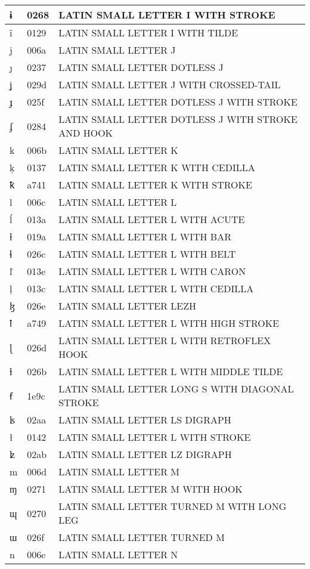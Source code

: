 \documentclass[12pt,letterpaper,openany]{book}
\begin{document}
\begin{center}
\begin{supertabular}{|m{0.25in}|m{0.5in}|m{4in}|}
ɨ & 0268 & LATIN SMALL LETTER I WITH STROKE\\\hline
ĩ & 0129 & LATIN SMALL LETTER I WITH TILDE\\\hline
j & 006a & LATIN SMALL LETTER J\\\hline
ȷ & 0237 & LATIN SMALL LETTER DOTLESS J\\\hline
ʝ & 029d & LATIN SMALL LETTER J WITH CROSSED-TAIL\\\hline
ɟ & 025f & LATIN SMALL LETTER DOTLESS J WITH STROKE\\\hline
ʄ & 0284 & LATIN SMALL LETTER DOTLESS J WITH STROKE AND HOOK\\\hline
k & 006b & LATIN SMALL LETTER K\\\hline
ķ & 0137 & LATIN SMALL LETTER K WITH CEDILLA\\\hline
ꝁ & a741 & LATIN SMALL LETTER K WITH STROKE\\\hline
l & 006c & LATIN SMALL LETTER L\\\hline
ĺ & 013a & LATIN SMALL LETTER L WITH ACUTE\\\hline
ƚ & 019a & LATIN SMALL LETTER L WITH BAR\\\hline
ɬ & 026c & LATIN SMALL LETTER L WITH BELT\\\hline
ľ & 013e & LATIN SMALL LETTER L WITH CARON\\\hline
ļ & 013c & LATIN SMALL LETTER L WITH CEDILLA\\\hline
ɮ & 026e & LATIN SMALL LETTER LEZH\\\hline
ꝉ & a749 & LATIN SMALL LETTER L WITH HIGH STROKE\\\hline
ɭ & 026d & LATIN SMALL LETTER L WITH RETROFLEX HOOK\\\hline
ɫ & 026b & LATIN SMALL LETTER L WITH MIDDLE TILDE\\\hline
ẜ & 1e9c & LATIN SMALL LETTER LONG S WITH DIAGONAL STROKE\\\hline
ʪ & 02aa & LATIN SMALL LETTER LS DIGRAPH\\\hline
ł & 0142 & LATIN SMALL LETTER L WITH STROKE\\\hline
ʫ & 02ab & LATIN SMALL LETTER LZ DIGRAPH\\\hline
m & 006d & LATIN SMALL LETTER M\\\hline
ɱ & 0271 & LATIN SMALL LETTER M WITH HOOK\\\hline
ɰ & 0270 & LATIN SMALL LETTER TURNED M WITH LONG LEG\\\hline
ɯ & 026f & LATIN SMALL LETTER TURNED M\\\hline
n & 006e & LATIN SMALL LETTER N\\\hline

\end{supertabular}
\end{center}
\end{document}
